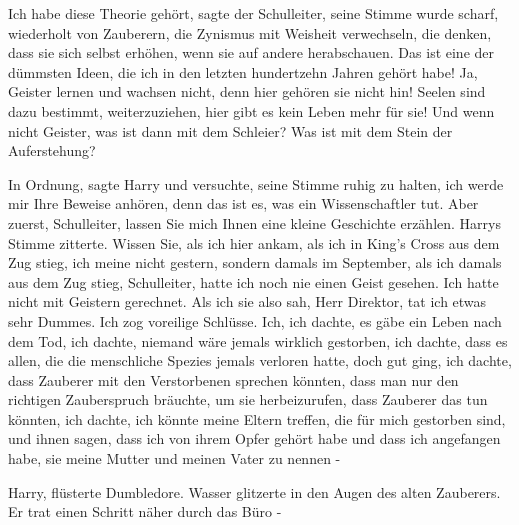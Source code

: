 \glqq{}Ich habe diese Theorie gehört\grqq{}, sagte der Schulleiter, seine Stimme
wurde scharf, \glqq{}wiederholt von Zauberern, die Zynismus mit Weisheit
verwechseln, die denken, dass sie sich selbst erhöhen, wenn sie auf andere
herabschauen. Das ist eine der dümmsten Ideen, die ich in den letzten
hundertzehn Jahren gehört habe! Ja, Geister lernen und wachsen nicht, denn hier
gehören sie nicht hin! Seelen sind dazu bestimmt, weiterzuziehen, hier gibt es
kein Leben mehr für sie! Und wenn nicht Geister, was ist dann mit dem Schleier?
Was ist mit dem Stein der Auferstehung?\grqq{}

\glqq{}In Ordnung\grqq{}, sagte Harry und versuchte, seine Stimme ruhig zu
halten, \glqq{}ich werde mir Ihre Beweise anhören, denn das ist es, was ein
Wissenschaftler tut. Aber zuerst, Schulleiter, lassen Sie mich Ihnen eine kleine
Geschichte erzählen.\grqq{} Harrys Stimme zitterte. \glqq{}Wissen Sie, als ich
hier ankam, als ich in King's Cross aus dem Zug stieg, ich meine nicht gestern,
sondern damals im September, als ich damals aus dem Zug stieg, Schulleiter,
hatte ich noch nie einen Geist gesehen. Ich hatte nicht mit Geistern gerechnet.
Als ich sie also sah, Herr Direktor, tat ich etwas sehr Dummes. Ich zog
voreilige Schlüsse. Ich, ich dachte, es gäbe ein Leben nach dem Tod, ich dachte,
niemand wäre jemals wirklich gestorben, ich dachte, dass es allen, die die
menschliche Spezies jemals verloren hatte, doch gut ging, ich dachte, dass
Zauberer mit den Verstorbenen sprechen könnten, dass man nur den richtigen
Zauberspruch bräuchte, um sie herbeizurufen, dass Zauberer das tun könnten, ich
dachte, ich könnte meine Eltern treffen, die für mich gestorben sind, und ihnen
sagen, dass ich von ihrem Opfer gehört habe und dass ich angefangen habe, sie
meine Mutter und meinen Vater zu nennen -\grqq{}

\glqq{}Harry\grqq{}, flüsterte Dumbledore. Wasser glitzerte in den Augen des
alten Zauberers. Er trat einen Schritt näher durch das Büro -

